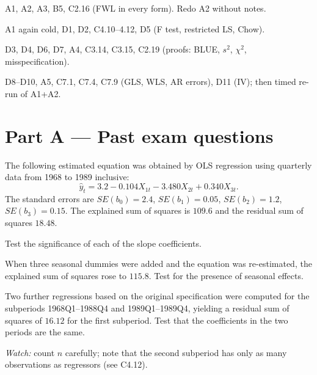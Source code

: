 \documentclass[11pt]{article}
\begin{document}
\begin{flatlist}
  \item[Day 1] A1, A2, A3, B5, C2.16 (FWL in every form). Redo A2 without notes.
  \item[Day 2] A1 again cold, D1, D2, C4.10--4.12, D5 (F test, restricted LS, Chow).
  \item[Day 3] D3, D4, D6, D7, A4, C3.14, C3.15, C2.19 (proofs: BLUE, $s^{2}$, $\chi^{2}$, misspecification).
  \item[Day 4] D8--D10, A5, C7.1, C7.4, C7.9 (GLS, WLS, AR errors), D11 (IV); then timed re-run of A1+A2.
\end{flatlist}

\section{Part A --- Past exam questions}

The following estimated equation was obtained by OLS regression using quarterly
data from 1968 to 1989 inclusive:
\[
  \hat y_{t} = 3.2 - 0.104X_{1t} - 3.480X_{2t} + 0.340X_{3t}.
\]
The standard errors are $SE(b_{0}) = 2.4$, $SE(b_{1}) = 0.05$, $SE(b_{2}) = 1.2$,
$SE(b_{3}) = 0.15$. The explained sum of squares is $109.6$ and the residual sum
of squares $18.48$.
\begin{flatlist}
  \item[(a)] Test the significance of each of the slope coefficients.
  \item[(b)] When three seasonal dummies were added and the equation was
        re-estimated, the explained sum of squares rose to $115.8$. Test for the
        presence of seasonal effects.
  \item[(c)] Two further regressions based on the original specification were
        computed for the subperiods 1968Q1--1988Q4 and 1989Q1--1989Q4, yielding
        a residual sum of squares of $16.12$ for the first subperiod. Test that the
        coefficients in the two periods are the same.
\end{flatlist}
\emph{Watch:} count $n$ carefully; note that the second subperiod has only as
many observations as regressors (see C4.12).
\end{document}
